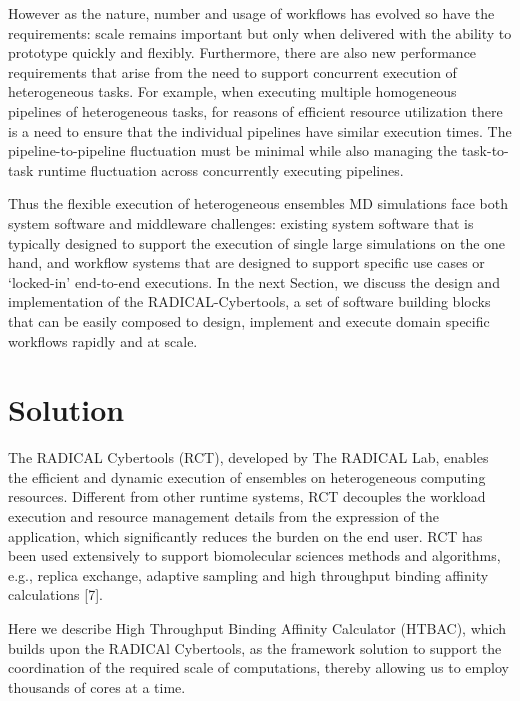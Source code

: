 \documentclass[conference]{IEEEtran}
\begin{document}
However as the nature, number and usage of workflows has evolved so have the
requirements: scale remains important but only when delivered with the
ability to prototype quickly and flexibly. Furthermore, there are also new
performance requirements that arise from the need to support concurrent
execution of heterogeneous tasks. For example, when executing multiple
homogeneous pipelines of heterogeneous tasks, for reasons of efficient
resource utilization there is a need to ensure that the individual pipelines
have similar execution times. The pipeline-to-pipeline fluctuation must be
minimal while also managing the task-to-task runtime fluctuation across
concurrently executing pipelines.


Thus the flexible execution of heterogeneous ensembles MD simulations face
both system software and middleware challenges: existing system software that
is typically designed to support the execution of single large simulations on
the one hand, and workflow systems that are designed to support specific use
cases or `locked-in' end-to-end executions. In the next Section, we discuss
the design and implementation of the RADICAL-Cybertools, a set of software
building blocks that can be easily composed to design, implement and execute
domain specific workflows rapidly and at scale.

\section{Solution}\label{sec:solution}

The RADICAL Cybertools (RCT), developed by The RADICAL Lab, enables the 
efficient and dynamic execution of ensembles on heterogeneous computing 
resources. Different from other runtime systems, RCT decouples the workload 
execution and resource management details from the expression of the 
application, which significantly reduces the burden on the end user. 
RCT has been used extensively to support 
biomolecular sciences methods and algorithms, e.g., replica exchange, adaptive
sampling and high throughput binding affinity calculations [7]. 

Here we describe High Throughput Binding Affinity Calculator (HTBAC), 
which builds upon the RADICAl Cybertools, as the framework solution to support 
the coordination of the required scale of computations, thereby 
allowing us to employ thousands of cores at a time.
\end{document}
